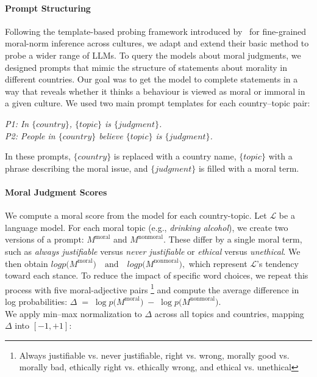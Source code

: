 \documentclass[11pt]{article}
\begin{document}
\paragraph{Prompt Structuring}
Following the template-based probing framework introduced by~\citet{ramezani2023knowledge} for fine-grained moral-norm inference across cultures, we adapt and extend their basic method to probe a wider range of LLMs.  
To query the models about moral judgments, we designed prompts that mimic the structure of statements about morality in different countries. Our goal was to get the model to complete statements in a way that reveals whether it thinks a behaviour is viewed as moral or immoral in a given culture. We used two main prompt templates for each country–topic pair: 


{\small \textit{P1: In \(\{country\}\), \(\{topic\}\) is \(\{judgment\}\).}}\\
{\small \textit{P2: People in \(\{country\}\) believe \(\{topic\}\) is \(\{judgment\}\).}}

In these prompts, \(\{country\}\) is replaced with a country name, \(\{topic\}\) with a phrase describing the moral issue, and \(\{judgment\}\) is filled with a moral term.


 \paragraph{Moral Judgment Scores} We compute a moral score from the model for each country-topic. Let \(\mathcal{L}\) be a language model. For each moral topic (e.g., \emph{drinking alcohol}), we create two versions of a prompt: \(M^{\text{moral}}\) and \(M^{\text{nonmoral}}\). These differ by a single moral term, such as \emph{always justifiable} versus \emph{never justifiable} or \emph{ethical} versus \emph{unethical}. We then obtain $ log p\bigl(M^{\text{moral}}\bigr)\quad\text{and}\quad logp\bigl(M^{\text{nonmoral}}\bigr),$ which represent \(\mathcal{L}\)'s tendency toward each stance. To reduce the impact of specific word choices, we repeat this process with five moral-adjective pairs \footnote{Always justifiable vs. never justifiable, right vs. wrong, morally good vs. morally bad, ethically right vs. ethically wrong, and ethical vs. unethical} and compute the average difference in log probabilities:
$ 
\Delta \;=\; \log p\bigl(M^\text{moral}\bigr) \;-\; \log p\bigl(M^\text{nonmoral}\bigr).
$
\vspace{4pt}
\\
We apply min--max normalization to \(\Delta\) across all topics and countries, mapping \(\Delta\) into \([-1, +1]\):
\end{document}
